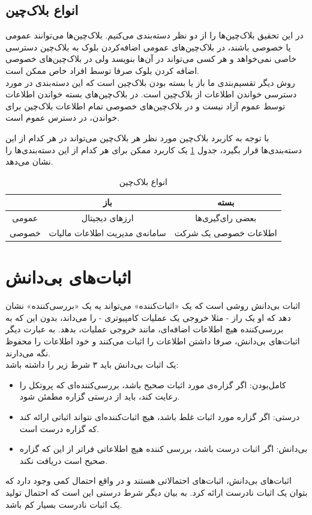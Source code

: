  \subsection{انواع بلاک‌چین}
 در این تحقیق بلاک‌چین‌ها را از دو نظر دسته‌‌بندی می‌کنیم. بلاک‌چین‌ها می‌توانند عمومی یا خصوصی باشند، در بلاک‌چین‌های عمومی اضافه‌کردن بلوک به بلاک‌چین دسترسی خاصی نمی‌خواهد و هر کسی می‌تواند در آن‌ها بنویسد ولی در بلاک‌چین‌های خصوصی اضافه کردن بلوک صرفا توسط افراد خاص ممکن است. 
 \\
 روش دیگر تقسیم‌بندی ما باز یا بسته بودن بلاک‌چین است که این دسته‌بندی در مورد دسترسی خواندن اطلاعات از بلاک‌چین است. در بلاک‌چین‌های بسته خواندن اطلاعات توسط عموم آزاد نیست و در بلاک‌چین‌های خصوصی تمام اطلاعات بلاک‌چین برای خواندن، در دسترس عموم است. 
\par
با توجه به کاربرد بلاک‌چین مورد نظر هر بلاک‌چین می‌تواند در هر کدام از این دسته‌بندی‌ها قرار بگیرد، جدول  \ref{tab:tch} یک کاربرد ممکن برای هر کدام از این دسته‌بندی‌ها را نشان می‌دهد.

\begin{table}[h]
	\begin{center}
		\caption{انواع بلاک‌چین}
		\begin{tabular}{|c|c|c|}
			\hline
			& باز & بسته \\
			\hline
			عمومی & ارز‌های دیجیتال & بعضی رای‌گیری‌ها \\
			\hline
			خصوصی & سامانه‌ی مدیریت اطلاعات مالیات & اطلاعات خصوصی یک شرکت \\
			\hline

		\end{tabular}
		\label{tab:tch}
	\end{center}
\end{table}


 
 
\section{اثبات‌های بی‌دانش}
اثبات‌ بی‌دانش 
روشی است که یک «اثبات‌کننده» می‌تواند یه یک «بررسی‌کننده» نشان دهد که او یک راز - مثلا خروجی یک عملیات کامپیوتری - را می‌داند، بدون این که به بررسی‌کننده هیچ اطلاعات اضافه‌ای، مانند خروجی عملیات، بدهد. به عبارت دیگر اثبات‌های بی‌دانش، صرفا داشتن اطلاعات را اثبات می‌کنند و خود اطلاعات را محفوظ نگه‌ می‌دارند.
\\
یک اثبات بی‌دانش باید ۳ شرط زیر را داشته باشد:
\begin{itemize}
	\item
	کامل‌بودن: اگر گزاره‌ی مورد اثبات صحیح باشد، بررسی‌کننده‌ای که پروتکل را رعایت کند، باید از درستی گزاره مطمئن شود.
	\item 
	درستی: اگر گزاره مورد اثبات غلط باشد، هیچ اثبات‌کننده‌ای نتواند اثباتی ارائه کند که گزاره درست است. 
	\item 
	بی‌دانش: اگر اثبات درست باشد، بررسی کننده هیچ اطلاعاتی فراتر از این که گزاره صحیح است دریافت نکند.
\end{itemize}
اثبات‌های بی‌دانش، اثبات‌های احتمالاتی هستند و در واقع احتمال کمی وجود دارد که بتوان یک اثبات نادرست ارائه کرد. به بیان دیگر شرط درستی این است که احتمال تولید یک اثبات نادرست بسیار کم باشد. 
